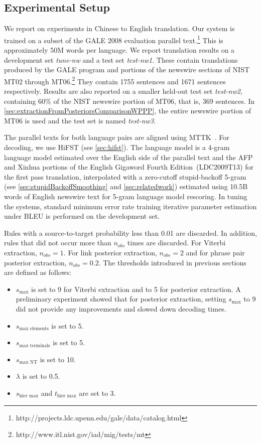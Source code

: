 \subsection{Experimental Setup}
\label{sec:extractionFromPosteriorsExperimentalSetup}

We report on experiments in Chinese to English translation. Our system is
trained on a subset of the GALE 2008 evaluation parallel
text.\footnote{http://projects.ldc.upenn.edu/gale/data/catalog.html} This is
approximately 50M words per language. We report translation results on a
development set \emph{tune-nw} and a test set \emph{test-nw1}. These contain
translations produced by the GALE program and portions of the newswire sections
of NIST MT02 through MT06.\footnote{http://www.itl.nist.gov/iad/mig/tests/mt}
They contain 1755 sentences and 1671 sentences respectively. Results are also
reported on a smaller held-out test set {\it test-nw2}, containing 60\% of the
NIST newswire portion of MT06, that is, 369 sentences.
In \autoref{sec:extractionFromPosteriorsComparisonWPPP}, the entire newswire
portion of MT06 is used and the test set is named \emph{test-nw3}.

The parallel texts for both language pairs are aligned using
MTTK~\citep{deng-byrne:2005:HLTEMNLP,deng-and-byrne:2008:ASLP}. For decoding,
we use HiFST (see \autoref{sec:hifst}). The language model
is a 4-gram language model estimated over the English side of the parallel text
and the AFP and Xinhua portions of the English Gigaword Fourth
Edition~(LDC2009T13) for the first pass translation, interpolated with a
zero-cutoff stupid-backoff
5-gram (see \autoref{sec:stupidBackoffSmoothing} and
\autoref{sec:relatedwork}) estimated using 10.5B words of English newswire text for 5-gram language
model rescoring. In tuning the systems, standard minimum error rate training
iterative parameter estimation under BLEU is performed on the development set.

Rules with a source-to-target probability less than 0.01 are discarded. In
addition, rules that did not occur more than $n_{obs}$ times are discarded. For
Viterbi extraction, $n_{obs} = 1$. For link posterior extraction, $n_{obs} = 2$
and for phrase pair posterior extraction, $n_{obs} = 0.2$.
The thresholds introduced in previous sections are defined as follows:
%
\begin{itemize}
  \item $s_{\text{max}}$ is set to 9 for Viterbi extraction and to 5 for
posterior extraction. A preliminary experiment showed that for posterior
extraction, setting $s_{\text{max}}$ to 9 did not provide any improvements
and slowed down decoding times.
  \item $s_{\text{max elements}}$ is set to 5.
  \item $s_{\text{max terminals}}$ is set to 5.
  \item $s_{\text{max NT}}$ is set to 10.
  \item $\lambda$ is set to 0.5.
  \item $s_{\text{hier max}}$ and $t_{\text{hier max}}$ are set to 3.
\end{itemize}

